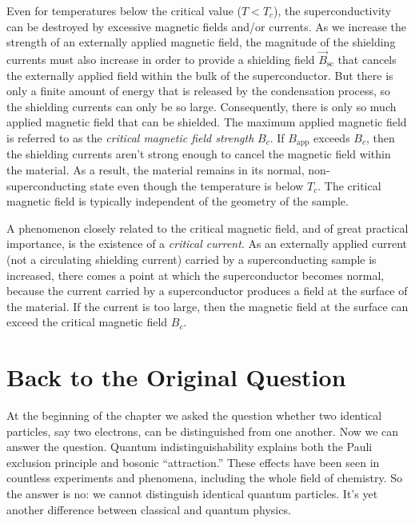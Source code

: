 Even for temperatures below the critical value ($T < T_c$), the
superconductivity can be destroyed by excessive magnetic fields and/or
currents.  As we increase the strength of an externally applied
magnetic field, the magnitude of the shielding currents must also
increase in order to provide a shielding field $\vec B_\text{sc}$ that
cancels the externally applied field within the bulk of the
superconductor.  But there is only a finite amount of energy that is
released by the condensation process, so the shielding currents can
only be so large.  Consequently, there is only so much applied
magnetic field that can be shielded.  The maximum applied magnetic
field is referred to as the {\em critical magnetic field strength}
$B_c$.  If $B_\text{app}$ exceeds $B_c$, then the shielding currents aren't
strong enough to cancel the magnetic field within the material.  As a
result, the material remains in its normal, non-superconducting state
even though the temperature is below $T_c$.  The critical magnetic
field is typically independent of the geometry of the sample.


A phenomenon closely related to the critical magnetic field, and of
great practical importance, is the existence of a {\em critical
current}.  As an externally applied current (not a circulating
shielding current) carried by a superconducting sample is increased,
there comes a point at which the superconductor becomes normal, because
the current carried by a superconductor produces a field
at the surface of the material.  If the current is too large, then the
magnetic field at the surface can exceed the critical magnetic field
$B_c$.


\section{Back to the Original Question}
\label{sec:backto_original_question}

At the beginning of the chapter we asked the question whether two
identical particles, say two electrons, can be distinguished from one
another.  Now we can answer the question.  Quantum indistinguishability
explains both the Pauli exclusion principle and bosonic ``attraction.''
These effects have been seen in countless experiments and phenomena,
including the whole field of chemistry.  So the answer is no: we
cannot distinguish identical quantum particles.  It's yet another
difference between classical and quantum physics.

